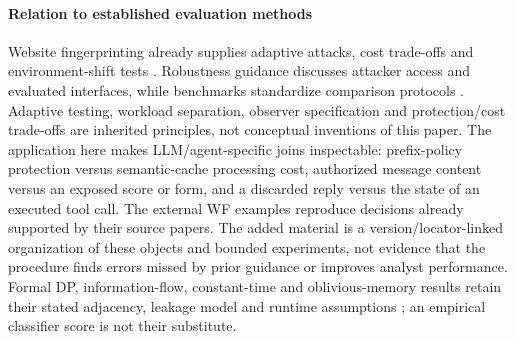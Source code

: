\paragraph{Relation to established evaluation methods}
Website fingerprinting already supplies adaptive attacks, cost trade-offs and environment-shift tests \cite{cai2014systematic,juarez2014critical,mathews2023critical}. Robustness guidance discusses attacker access and evaluated interfaces, while benchmarks standardize comparison protocols \cite{tramer2020adaptive,carlini2019evaluating,croce2021robustbench}. Adaptive testing, workload separation, observer specification and protection/cost trade-offs are inherited principles, not conceptual inventions of this paper. The application here makes LLM/agent-specific joins inspectable: prefix-policy protection versus semantic-cache processing cost, authorized message content versus an exposed score or form, and a discarded reply versus the state of an executed tool call. The external WF examples reproduce decisions already supported by their source papers. The added material is a version/locator-linked organization of these objects and bounded experiments, not evidence that the procedure finds errors missed by prior guidance or improves analyst performance. Formal DP, information-flow, constant-time and oblivious-memory results retain their stated adjacency, leakage model and runtime assumptions \cite{dwork2014foundations,smith2009qif,almeida2016constanttime,stefanov2013pathoram}; an empirical classifier score is not their substitute.

